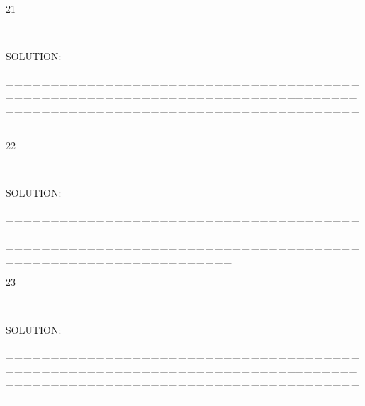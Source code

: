 \documentclass[a4paper, 11pt, UTF8]{article}
\begin{document}
\begin{large}
{\timesbf\Large 21} {\timessl\Large 
}\par\quad\,
{\timessl\Large
}\par
{\timesbf S\footnotesize{OLUTION:}}\par\quad

\par
{\tiny \_\,\_\,\_\,\_\,\_\,\_\,\_\,\_\,\_\,\_\,\_\,\_\,\_\,\_\,\_\,\_\,\_\,\_\,\_\,\_\,\_\,\_\,\_\,\_\,\_\,\_\,\_\,\_\,\_\,\_\,\_\,\_\,\_\,\_\,\_\,\_\,\_\,\_\,\_\,\_\,\_\,\_\,\_\,\_\,\_\,\_\,\_\,\_\,\_\,\_\,\_\,\_\,\_\,\_\,\_\,\_\,\_\,\_\,\_\,\_\,\_\,\_\,\_\,\_\,\_\,\_\,\_\,\_\,\_\,\_\,\_\_\,\_\,\_\,\_\,\_\,\_\,\_\,\_\,\_\,\_\,\_\,\_\,\_\,\_\,\_\,\_\,\_\,\_\,\_\,\_\,\_\,\_\,\_\,\_\,\_\,\_\,\_\,\_\,\_\,\_\,\_\,\_\,\_\,\_\,\_\,\_\,\_\,\_\,\_\,\_\,\_\,\_\,\_\,\_\,\_\,\_\,\_\,\_\,\_\,\_\,\_\,\_\,\_\,\_\,\_\,\_\,\_\,\_\,\_\,\_\,\_\,\_\,\_\,\_\,\_\,\_\,\_\,\_\,\_\,\_\,\_}\par

{\timesbf\Large 22} {\timessl\Large 
}\par\quad\,
{\timessl\Large
}\par
{\timesbf S\footnotesize{OLUTION:}}\par\quad

\par
{\tiny \_\,\_\,\_\,\_\,\_\,\_\,\_\,\_\,\_\,\_\,\_\,\_\,\_\,\_\,\_\,\_\,\_\,\_\,\_\,\_\,\_\,\_\,\_\,\_\,\_\,\_\,\_\,\_\,\_\,\_\,\_\,\_\,\_\,\_\,\_\,\_\,\_\,\_\,\_\,\_\,\_\,\_\,\_\,\_\,\_\,\_\,\_\,\_\,\_\,\_\,\_\,\_\,\_\,\_\,\_\,\_\,\_\,\_\,\_\,\_\,\_\,\_\,\_\,\_\,\_\,\_\,\_\,\_\,\_\,\_\,\_\_\,\_\,\_\,\_\,\_\,\_\,\_\,\_\,\_\,\_\,\_\,\_\,\_\,\_\,\_\,\_\,\_\,\_\,\_\,\_\,\_\,\_\,\_\,\_\,\_\,\_\,\_\,\_\,\_\,\_\,\_\,\_\,\_\,\_\,\_\,\_\,\_\,\_\,\_\,\_\,\_\,\_\,\_\,\_\,\_\,\_\,\_\,\_\,\_\,\_\,\_\,\_\,\_\,\_\,\_\,\_\,\_\,\_\,\_\,\_\,\_\,\_\,\_\,\_\,\_\,\_\,\_\,\_\,\_\,\_\,\_}\par

{\timesbf\Large 23} {\timessl\Large 
}\par\quad\,
{\timessl\Large
}\par
{\timesbf S\footnotesize{OLUTION:}}\par\quad

\par
{\tiny \_\,\_\,\_\,\_\,\_\,\_\,\_\,\_\,\_\,\_\,\_\,\_\,\_\,\_\,\_\,\_\,\_\,\_\,\_\,\_\,\_\,\_\,\_\,\_\,\_\,\_\,\_\,\_\,\_\,\_\,\_\,\_\,\_\,\_\,\_\,\_\,\_\,\_\,\_\,\_\,\_\,\_\,\_\,\_\,\_\,\_\,\_\,\_\,\_\,\_\,\_\,\_\,\_\,\_\,\_\,\_\,\_\,\_\,\_\,\_\,\_\,\_\,\_\,\_\,\_\,\_\,\_\,\_\,\_\,\_\,\_\_\,\_\,\_\,\_\,\_\,\_\,\_\,\_\,\_\,\_\,\_\,\_\,\_\,\_\,\_\,\_\,\_\,\_\,\_\,\_\,\_\,\_\,\_\,\_\,\_\,\_\,\_\,\_\,\_\,\_\,\_\,\_\,\_\,\_\,\_\,\_\,\_\,\_\,\_\,\_\,\_\,\_\,\_\,\_\,\_\,\_\,\_\,\_\,\_\,\_\,\_\,\_\,\_\,\_\,\_\,\_\,\_\,\_\,\_\,\_\,\_\,\_\,\_\,\_\,\_\,\_\,\_\,\_\,\_\,\_\,\_}\par


\end{large}
\end{document}
